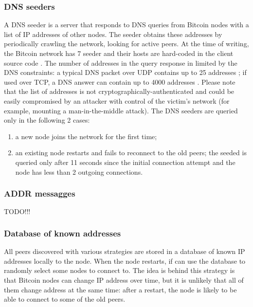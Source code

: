 \subsubsection{DNS seeders}
A DNS seeder is a server that responds to \ac{DNS} queries from Bitcoin nodes with a list of IP addresses of other nodes.
The seeder obtains these addresses by periodically crawling the network, looking for active peers.
At the time of writing, the Bitcoin network has \num{7} seeder and their hosts are hard-coded in the client source code \cite{bitcoin_dns}.
The number of addresses in the query response in limited by the \ac{DNS} constraints:
a typical \ac{DNS} packet over UDP contains up to \num{25} addresses \cite{dns_stackoverflow};
if used over TCP, a \ac{DNS} answer can contain up to \num{4000} addresses \cite{dns_4000}.
Please note that the list of addresses is not cryptographically-authenticated and could be easily compromised by an attacker with control of the victim's network (for example, mounting a man-in-the-middle attack).
The DNS seeders are queried only in the following \num{2} cases:
\begin{enumerate}
	\item a new node joins the network for the first time;
	\item an existing node restarts and fails to reconnect to the old peers; the seeded is queried only after \num{11} seconds since the initial connection attempt and the node has less than \num{2} outgoing connections.
\end{enumerate}

\subsubsection{ADDR messagges}
TODO!!!

\subsubsection{Database of known addresses}
All peers discovered with various strategies are stored in a database of known IP addresses locally to the node.
When the node restarts, if can use the database to randomly select some nodes to connect to.
The idea is behind this strategy is that Bitcoin nodes can change IP address over time, but it is unlikely that all of them change address at the same time:
after a restart, the node is likely to be able to connect to some of the old peers.

